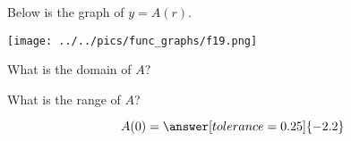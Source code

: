 \documentclass{ximera}
\author{Lee Wayand}
\begin{document}
\begin{exercise}  





Below is the graph of $y=A(r)$.  

\begin{image}
\texttt{[image: ../../pics/func\_graphs/f19.png]}
\end{image}









\begin{question} 


What is the domain of $A$?\\


\begin{multipleChoice}
\choice {$[-9, 9]$}
\choice [correct]{$(-\infty, \infty)$}
\end{multipleChoice}

\end{question}






\begin{question} 


What is the range of $A$?\\


\begin{multipleChoice}
\choice {$(-\infty, \infty)$}
\choice {$(-\infty, 3] \cup (3, \infty)$}
\choice {$[-3.8, \infty)$}
\choice [correct]{$[-3.8, 0) \cup (0, \infty)$}
\end{multipleChoice}


\end{question}









\begin{question} 



\[  A(0) = \answer[tolerance=0.25]{-2.2}  \]

\end{question}










\begin{question} 




\end{question}
\end{exercise}
\end{document}
